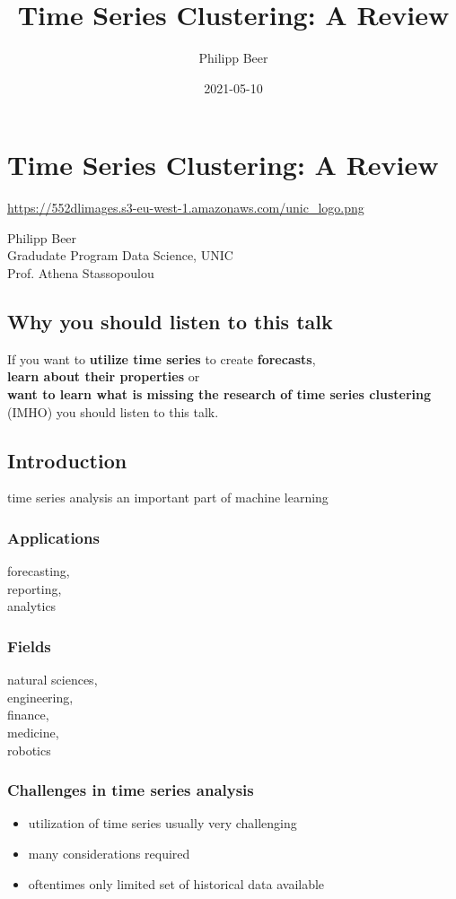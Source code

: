 \documentclass[11pt]{article}
\author{Philipp Beer}
\date{2021-05-10}
\title{Time Series Clustering: A Review}
\begin{document}
\maketitle




\section*{Time Series Clustering: A Review}
\label{sec:org5dcde06}
\url{https://552dlimages.s3-eu-west-1.amazonaws.com/unic\_logo.png}

Philipp Beer\\
Gradudate Program Data Science, UNIC\\
Prof. Athena Stassopoulou
\subsection*{Why you should listen to this talk}
\label{sec:org5b035e5}
If you want to \textbf{utilize time series} to create \textbf{forecasts},\\
\textbf{learn about their properties} or\\
\textbf{want to learn what is missing the research of time series clustering}\\
(IMHO) you should listen to this talk.
\subsection*{Introduction}
\label{sec:org4689d8c}
time series analysis an important part of machine learning

\subsubsection*{Applications}
\label{sec:org77858f6}
forecasting,\\
reporting,\\
analytics
\subsubsection*{Fields}
\label{sec:org12814ad}
natural sciences,\\
engineering,\\
finance,\\
medicine,\\
robotics
\subsubsection*{Challenges in time series analysis}
\label{sec:org59d6573}
\begin{itemize}
\item utilization of time series usually very challenging
\item many considerations required
\item oftentimes only limited set of historical data available
\end{itemize}
\end{document}
